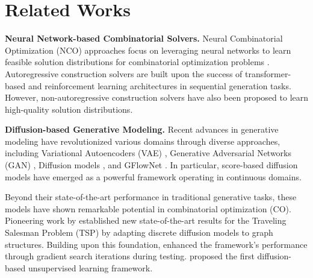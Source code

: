 \section{Related Works}
\noindent\textbf{Neural Network-based Combinatorial Solvers.} Neural Combinatorial Optimization (NCO) approaches focus on leveraging neural networks to learn feasible solution distributions for combinatorial optimization problems \cite{bengio2021machine, zhang2023survey}. Autoregressive construction solvers \cite{khalil2017learning, kool2018attention, kwon2020pomo, kim2022sym, hottung2021learning} are built upon the success of transformer-based \cite{vaswani2017attention} and reinforcement learning architectures in sequential generation tasks. However, non-autoregressive construction solvers \cite{joshi2019efficient, fu2021generalize, qiu2022dimes, wang2024asp, sun2023difusco, sanokowski2024diffusion} have also been proposed to learn high-quality solution distributions.

\noindent\textbf{Diffusion-based Generative Modeling.} Recent advances in generative modeling have revolutionized various domains through diverse approaches, including Variational Autoencoders (VAE) \cite{kingma2013auto}, Generative Adversarial Networks (GAN) \cite{goodfellow2020generative}, Diffusion models \cite{ho2020denoising}, and GFlowNet \cite{bengio2023gflownet}. In particular, score-based diffusion models \cite{ho2020denoising, song2020score, sohl2015deep, song2019generative, dhariwal2021diffusion} have emerged as a powerful framework operating in continuous domains.

Beyond their state-of-the-art performance in traditional generative tasks, these models have shown remarkable potential in combinatorial optimization (CO). Pioneering work by \cite{sun2023difusco} established new state-of-the-art results for the Traveling Salesman Problem (TSP) by adapting discrete diffusion models \cite{austin2021structured} to graph structures. Building upon this foundation, \cite{li2024distribution} enhanced the framework's performance through gradient search iterations during testing. \cite{sanokowski2024diffusion} proposed the first diffusion-based unsupervised learning framework.

